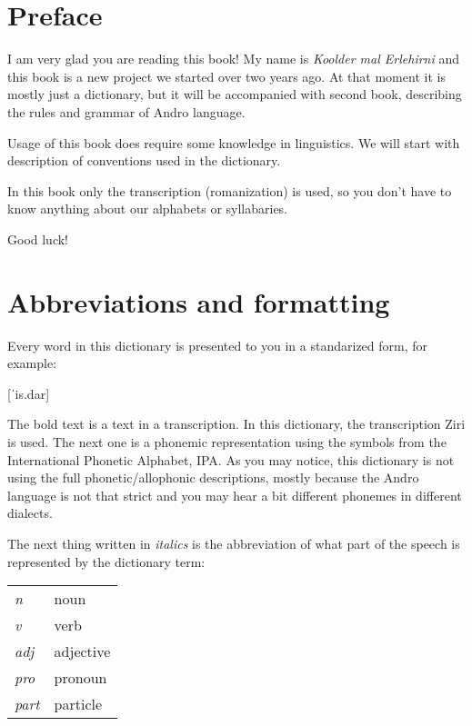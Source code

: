 \newpage

\section{Preface}

\begin{spacing}{1.1}

I am very glad you are reading this book! My name is \emph{Koolder mal
Erlehirni} and this book is a new project we started over two years ago. At that
moment it is mostly just a dictionary, but it will be accompanied with second
book, describing the rules and grammar of Andro language.

Usage of this book does require some knowledge in linguistics. We will start
with description of conventions used in the dictionary.

In this book only the transcription (romanization) is used, so you don't have to
know anything about our alphabets or syllabaries.

\bigskip

Good luck!

\section[Abbreviations and format]{Abbreviations and formatting}

Every word in this dictionary is presented to you in a standarized form, for
example:

[ˈis.dar]

The bold text is a text in a transcription. In this dictionary, the
transcription Ziri is used. The next one is a phonemic representation using the
symbols from the International Phonetic Alphabet, IPA. As you may notice, this
dictionary is not using the full phonetic/allophonic descriptions, mostly
because the Andro language is not that strict and you may hear a bit different
phonemes in different dialects.

The next thing written in \emph{italics} is the abbreviation of what part of the
speech is represented by the dictionary term:

\begin{table}[h]
\begin{tabular}{ll}
\emph{n}    & noun           \\
\emph{v}    & verb            \\
\emph{adj}  & adjective          \\
\emph{pro}  & pronoun \\
\emph{part} & particle
\end{tabular}
\end{table}


\end{spacing}
